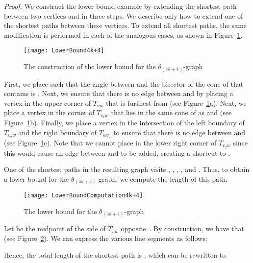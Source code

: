 \documentclass[12pt]{article}
\newenvironment{proof}{\emph{Proof.}}{\hfill \\}
\newcommand{\graph}[1]{\ensuremath{\theta_{(4 k + #1)}}-graph\xspace}
\newcommand{\canon}[2]{\ensuremath{T_{#1 #2}}}
\begin{document}
\begin{proof}
We construct the lower bound example by extending the shortest path between two vertices  and  in three steps. We describe only how to extend one of the shortest paths between these vertices. To extend all shortest paths, the same modification is performed in each of the analogous cases, as shown in Figure~\ref{fig:LowerBound4k+4}. 

\begin{figure}[H]
  \begin{center}
    \texttt{[image: LowerBound4k+4]}
  \end{center}
  \vspace{-1em}
  \caption{The construction of the lower bound for the \graph{4}}
  \label{fig:LowerBound4k+4}
\end{figure}

First, we place  such that the angle between  and the bisector of the cone of  that contains  is . Next, we ensure that there is no edge between  and  by placing a vertex  in the upper corner of \canon{u}{w} that is furthest from  (see Figure~\ref{fig:LowerBound4k+4}a). Next, we place a vertex  in the corner of \canon{v_1}{w} that lies in the same cone of  as  and  (see Figure~\ref{fig:LowerBound4k+4}b). Finally, we place a vertex  in the intersection of the left boundary of \canon{v_2}{w} and the right boundary of \canon{w}{v_2} to ensure that there is no edge between  and  (see Figure~\ref{fig:LowerBound4k+4}c). Note that we cannot place  in the lower right corner of \canon{v_2}{w} since this would cause an edge between  and  to be added, creating a shortcut to . 

One of the shortest paths in the resulting graph visits , , , , and . Thus, to obtain a lower bound for the \graph{4}, we compute the length of this path. 

\begin{figure}[H]
  \begin{center}
    \texttt{[image: LowerBoundComputation4k+4]}
  \end{center}
  \caption{The lower bound for the \graph{4}}
  \label{fig:LowerBoundComputation4k+4}
\end{figure}

Let  be the midpoint of the side of \canon{u}{w} opposite~. By construction, we have that  (see Figure~\ref{fig:LowerBoundComputation4k+4}). We can express the various line segments as follows: 


Hence, the total length of the shortest path is , which can be rewritten to   
\end{proof}
\end{document}
